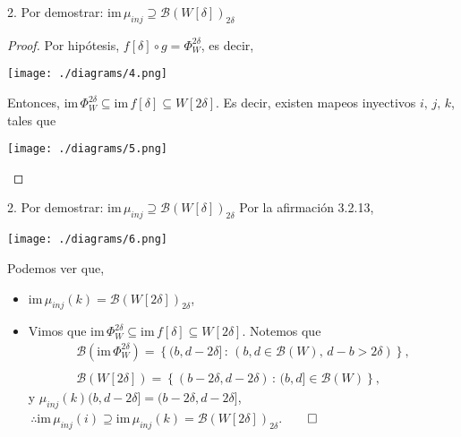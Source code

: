 \documentclass{beamer}
\begin{document}
\begin{frame}{2. Por demostrar: $\mbox{im} \, \mu_{inj}\supseteq \mathcal{B}(W[\delta])_{2\delta}$}
\begin{proof}\renewcommand{\qedsymbol}{}
Por hip\'otesis, $f[\delta]\circ g =\Phi_{W}^{2\delta}$, es decir,
\begin{center}
\texttt{[image: ./diagrams/4.png]}
\end{center}
Entonces, $\mbox{im}\,\Phi_{W}^{2\delta}\subseteq\mbox{im}\,f[\delta]\subseteq W[2\delta]$. Es decir, existen mapeos inyectivos $i,\,j,\,k$, tales que
\begin{center}
\texttt{[image: ./diagrams/5.png]}
\end{center}
\end{proof}
\end{frame}

\begin{frame}{2. Por demostrar: $\mbox{im} \, \mu_{inj}\supseteq \mathcal{B}(W[\delta])_{2\delta}$}
Por la afirmaci\'on 3.2.13,
\begin{center}
\texttt{[image: ./diagrams/6.png]}
\end{center}
Podemos ver que, 
\begin{itemize}
\item $\mbox{im}\, \mu_{inj} (k) =\mathcal{B}(W [2\delta])_{2\delta}$,
\item Vimos que $\mbox{im}\,\Phi_{W}^{2\delta}\subseteq\mbox{im}\,f[\delta]\subseteq W[2\delta]$. Notemos que
\begin{gather*}
\mathcal{B}(\mbox{im}\,\Phi_{W}^{2\delta})=\left\{ (b,d-2\delta]\,:\,(b,d\in \mathcal{B}(W),\,d-b>2\delta)\right\},\\
\\
\mathcal{B}(W[2\delta])=\left\{ (b-2\delta,d-2\delta)\,:\,(b,d]\in\mathcal{B}(W)\right\},
\end{gather*}
y $\mu_{inj} (k)(b, d - 2\delta] = (b - 2\delta, d - 2\delta]$,\\
$\,$\hfill  $\therefore \mbox{im}\, \mu_{inj} (i) \supseteq \mbox{im}\,\mu_{inj} (k) =\mathcal{B}(W [2\delta])_{2\delta}$.\hspace{3em}$\qed$
\end{itemize}


\end{frame}
\end{document}
